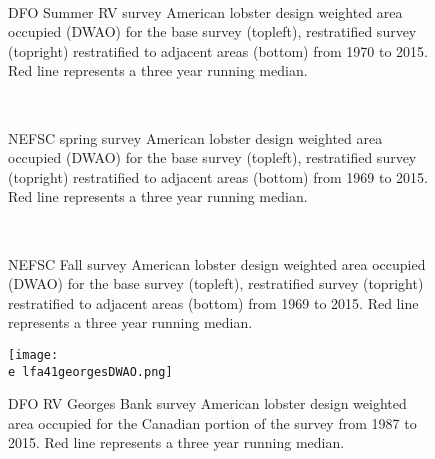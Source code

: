 \documentclass[11pt]{article}
\newcommand{\e}{/backup/bio_data/bio.lobster/figures/} %
\begin{document}
\begin{figure}
\centering
{}
\\
\caption{DFO Summer RV survey American lobster design weighted area occupied (DWAO) for the base survey (topleft), restratified survey (topright) restratified to adjacent areas (bottom) from 1970 to 2015. Red line represents a three year running median.}
\end{figure}
\clearpage


\begin{figure}
\centering
{}
\\
\caption{NEFSC spring survey American lobster design weighted area occupied (DWAO) for the base survey (topleft), restratified survey (topright) restratified to adjacent areas (bottom) from 1969 to 2015. Red line represents a three year running median. }
\end{figure}
\clearpage


\begin{figure}
\centering
{}
\\
\caption{NEFSC Fall survey American lobster design weighted area occupied (DWAO) for the base survey (topleft), restratified survey (topright) restratified to adjacent areas (bottom) from 1969 to 2015. Red line represents a three year running median. }
\end{figure}
\clearpage


\begin{figure}

    \texttt{[image: \\e lfa41georgesDWAO.png]}
    \caption{DFO RV Georges Bank survey American lobster design weighted area occupied for the Canadian portion of the survey from 1987 to 2015. Red line represents a three year running median. }

\end{figure}
\end{document}
